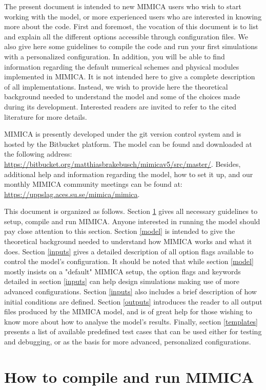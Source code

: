 \documentclass[12pt,A4,french]{article}
\begin{document}
The present document is intended to new MIMICA users who wish to start working with the model, or more experienced users who are interested in knowing more about the code. First and foremost, the vocation of this document is to list and explain all the different options accessible through configuration files. We also give here some guidelines to compile the code and run your first simulations with a personalized configuration. In addition, you will be able to find information regarding the default numerical schemes and physical modules implemented in MIMICA. It is not intended here to give a complete description of all implementations. Instead, we wish to provide here the theoretical background needed to understand the model and some of the choices made during its development. Interested readers are invited to refer to the cited literature for more details.

MIMICA is presently developed under the git version control system and is hosted by the Bitbucket platform. The model can be found and downloaded at the following address: \url{https://bitbucket.org/matthiasbrakebusch/mimicav5/src/master/}. Besides, additional help and information regarding the model, how to set it up, and our monthly MIMICA community meetings can be found at: \url{https://uppslag.aces.su.se/mimica/mimica}. 

This document is organized as follows. Section \ref{intro} gives all necessary guidelines to setup, compile and run MIMICA. Anyone interested in running the model should pay close attention to this section. Section \ref{model} is intended to give the theoretical background needed to understand how MIMICA works and what it does. Section \ref{inputs} gives a detailed description of all option flags available to control the model's configuration. It should be noted that while section \ref{model} mostly insists on a "default" MIMICA setup, the option flags and keywords detailed in section \ref{inputs} can help design simulations making use of more advanced configurations. Section \ref{inputs} also includes a brief description of how initial conditions are defined. Section \ref{outputs} introduces the reader to all output files produced by the MIMICA model, and is of great help for those wishing to know more about how to analyse the model's results. Finally, section \ref{templates} presents a list of available predefined test cases that can be used either for testing and debugging, or as the basis for more advanced, personalized configurations.

\newpage
\section{How to compile and run MIMICA}
\label{intro}
\end{document}
